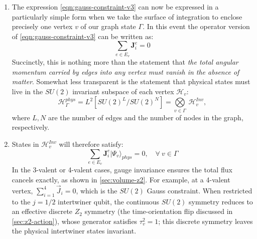 \documentclass[preprint]{SciPost}
\newcommand{\mb}[1]{\mathbf{#1}}
\newcommand{\mc}[1]{\mathcal{#1}}
\newcommand{\ket}[1]{\vert #1 \rangle}
\theoremstyle{plain} %
\begin{document}
\begin{enumerate}[label=\arabic*.]
		\begin{equation}\label{eqn:momentum-operator}
		n_a(e) \hat{E}^a_i = \mb{J}^e_i,
		\end{equation}
		where $ n_a(e) $ is the tangent vector to the edge $ e $. For the special case of $ j = 1/2 $, these are simply the Pauli matrices $ \hat{J}_i = \{ \sigma_x, \sigma_y, \sigma_z \} $.
		\item The expression \eqref{eqn:gauss-constraint-v3} can now be expressed in a particularly simple form when we take the surface of integration to enclose precisely one vertex $ v $ of our graph state $ \Gamma $. In this event the operator version of \eqref{eqn:gauss-constraint-v3} can be written as:
		\begin{equation}\label{eqn:gauss-operator-v1}
		\sum_{e \in E_v} \mb{J}^e_i = 0
		\end{equation}
		Succinctly, this is nothing more than the statement that \emph{the total angular momentum carried by edges into any vertex must vanish in the absence of matter}. Somewhat less transparent is the statement that physical states must live in the $ SU(2) $ invariant subspace of each vertex $ \mc{H}_v $:
		\begin{equation}\label{eqn:su2-invariant-space}
		\mc{H}_\Gamma^{phys} = L^2\left[SU(2)^L/SU(2)^N\right] = \underset{v \in \Gamma}{\bigotimes}~ \mathcal{H}_v^{Inv},
		\end{equation}
        where $ L, N $ are the number of edges and the number of nodes in the graph, respectively.
		\item States in $ \mc{H}_v^{Inv} $ will therefore satisfy:
		\begin{equation}\label{eqn:gauss-operator-v2}
		\sum_{e \in E_v} \mb{J}^e_i \ket{\Psi_v}_{phys} = 0, \quad \forall~v \in \Gamma
		\end{equation}
		In the 3-valent or 4-valent cases, gauge invariance ensures the total flux cancels exactly, as shown in \autoref{sec:volume-z2}. For example, at a 4-valent vertex, $\sum_{i=1}^4 \vec{J}_i = 0$, which is the $SU(2)$ Gauss constraint. When restricted to the $j=1/2$ intertwiner qubit, the continuous $SU(2)$ symmetry reduces to an effective discrete $Z_2$ symmetry (the time-orientation flip discussed in \autoref{sec:z2-action}), whose generator satisfies $\tau_v^2 = 1$; this discrete symmetry leaves the physical intertwiner states invariant.
	\end{enumerate}
\end{document}
